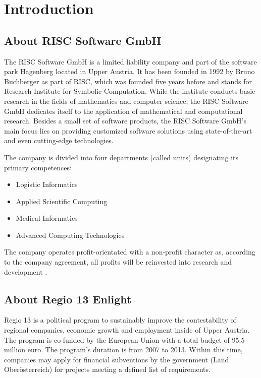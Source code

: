 \chapter{Introduction}

\section{About RISC Software GmbH}

The RISC Software GmbH is a limited liability company and part of the software park Hagenberg located in Upper Austria. It has been founded in 1992 by Bruno Buchberger as part of RISC, which was founded five years before and stands for Research Institute for Symbolic Computation. While the institute conducts basic research in the fields of mathematics and computer science, the RISC Software GmbH dedicates itself to the application of mathematical and computational research. Besides a small set of software products, the RISC Software GmbH's main focus lies on providing customized software solutions using state-of-the-art and even cutting-edge technologies.

The company is divided into four departments (called units) designating its primary competences:

\begin{itemize}
	\item Logistic Informatics
	\item Applied Scientific Computing
	\item Medical Informatics
	\item Advanced Computing Technologies
\end{itemize}

The company operates profit-orientated with a non-profit character as, according to the company agreement, all profits will be reinvested into research and development \cite{risc_website}.


\section{About Regio 13 Enlight}
\label{sec:about_enlight}

Regio 13 is a political program to sustainably improve the contestability of regional companies, economic growth and employment inside of Upper Austria. The program is co-funded by the European Union with a total budget of 95.5 million euro. The program's duration is from 2007 to 2013. Within this time, companies may apply for financial subventions by the government (Land Oberösterreich) for projects meeting a defined list of requirements.

